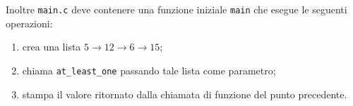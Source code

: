 \documentclass[12pt]{article}
\begin{document}
\noindent
Inoltre \texttt{main.c} deve contenere una funzione iniziale \texttt{main} che esegue
le seguenti operazioni:
\begin{enumerate}
\item crea una lista $5\rightarrow 12\rightarrow 6\rightarrow 15$;
\item chiama \texttt{at\_least\_one} passando tale lista come parametro;
\item stampa il valore ritornato dalla chiamata di funzione del punto precedente.
\end{enumerate}
\end{document}
